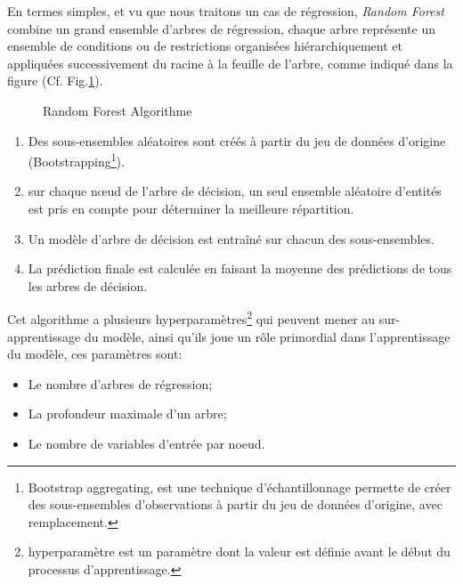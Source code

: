 En termes simples, et vu que nous traitons un cas de régression, \textit{Random Forest} combine un grand ensemble d'arbres de régression, chaque arbre représente un ensemble de conditions ou de restrictions organisées hiérarchiquement et appliquées successivement du racine à la feuille de l'arbre, comme indiqué dans la figure (Cf. Fig.\ref{RF_algo}).

\begin{figure}[!htb]
        \caption{ Random Forest Algorithme}
        \label{RF_algo}
\end{figure}
\begin{tcolorbox}
\footnotesize {
\begin{enumerate}
\item Des sous-ensembles aléatoires sont créés à partir du jeu de données d'origine (Bootstrapping\footnote{Bootstrap aggregating, est une technique d’échantillonnage permette de créer des sous-ensembles d’observations à partir du jeu de données d’origine, avec remplacement.}).
\item sur chaque nœud de l’arbre de décision, un seul ensemble aléatoire d’entités est pris en compte pour déterminer la meilleure répartition.
\item Un modèle d'arbre de décision est entraîné sur chacun des sous-ensembles.
\item La prédiction finale est calculée en faisant la moyenne des prédictions de tous les arbres de décision.
\end{enumerate}
}
\end{tcolorbox}

Cet algorithme a plusieurs hyperparamètres\footnote{hyperparamètre est un paramètre dont la valeur est définie avant le début du processus d'apprentissage.} qui peuvent mener au sur-apprentissage du modèle, ainsi qu'ils joue un rôle primordial dans l'apprentissage du modèle, ces paramètres sont:
\begin{itemize}
    \item[\textbullet] Le nombre d'arbres de régression;
    \item[\textbullet] La profondeur maximale d’un arbre;
    \item[\textbullet] Le nombre de variables d'entrée par noeud.
\end{itemize}



